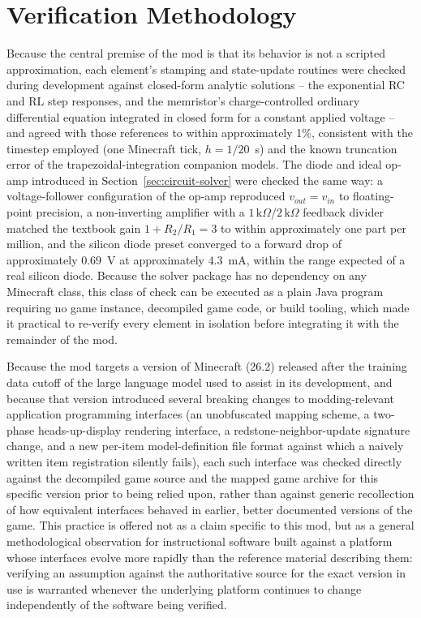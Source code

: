 \section{Verification Methodology}
\label{sec:validation}

Because the central premise of the mod is that its behavior is not a scripted
approximation, each element's stamping and state-update routines were checked during
development against closed-form analytic solutions -- the exponential RC and RL step
responses, and the memristor's charge-controlled ordinary differential equation integrated
in closed form for a constant applied voltage -- and agreed with those references to within
approximately 1\%, consistent with the timestep employed (one Minecraft tick,
$h = 1/20$~s) and the known truncation error of the trapezoidal-integration companion
models. The diode and ideal op-amp introduced in Section~\ref{sec:circuit-solver} were
checked the same way: a voltage-follower configuration of the op-amp reproduced
$v_{out} = v_{in}$ to floating-point precision, a non-inverting amplifier with a
$1\,\mathrm{k}\Omega$/$2\,\mathrm{k}\Omega$ feedback divider matched the textbook gain
$1 + R_2/R_1 = 3$ to within approximately one part per million, and the silicon diode preset
converged to a forward drop of approximately $0.69$~V at approximately $4.3$~mA, within the
range expected of a real silicon diode. Because the solver package has no dependency on any
Minecraft class, this class of check can be executed as a plain Java program requiring no
game instance, decompiled game code, or build tooling, which made it practical to re-verify
every element in isolation before integrating it with the remainder of the mod.

Because the mod targets a version of Minecraft (26.2) released after the training data
cutoff of the large language model used to assist in its development, and because that
version introduced several breaking changes to modding-relevant application programming
interfaces (an unobfuscated mapping scheme, a two-phase heads-up-display rendering
interface, a redstone-neighbor-update signature change, and a new per-item
model-definition file format against which a naively written item registration silently
fails), each such interface was checked directly against the decompiled game source and the
mapped game archive for this specific version prior to being relied upon, rather than
against generic recollection of how equivalent interfaces behaved in earlier, better
documented versions of the game. This practice is offered not as a claim specific to this
mod, but as a general methodological observation for instructional software built against a
platform whose interfaces evolve more rapidly than the reference material describing them:
verifying an assumption against the authoritative source for the exact version in use is
warranted whenever the underlying platform continues to change independently of the
software being verified.

